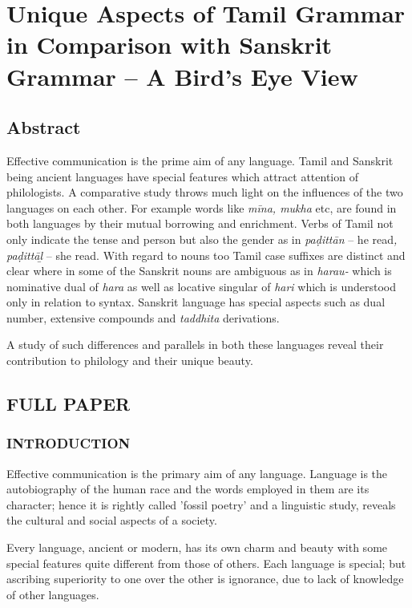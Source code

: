 
\chapter{Unique Aspects of Tamil Grammar in Comparison with Sanskrit Grammar – A Bird’s Eye View}\label{intro}



\section*{Abstract}

Effective communication is the prime aim of any language. Tamil and Sanskrit being ancient languages have special features which attract attention of philologists. A comparative study throws much light on the influences of the two languages on each other. For example words like \textit{mīna, mukha} etc, are found in both languages by their mutual borrowing and enrichment. Verbs of Tamil not only indicate the tense and person but also the gender as in \textit{paḍittān} – he read\textit{, paḍittāḻ} – she read. With regard to nouns too Tamil case suffixes are distinct and clear where in some of the Sanskrit nouns are ambiguous as in \textit{harau-} which is nominative dual of \textit{hara} as well as locative singular of \textit{hari} which is understood only in relation to syntax. Sanskrit language has special aspects such as dual number, extensive compounds and \textit{taddhita} derivations.

A study of such differences and parallels in both these languages reveal their contribution to philology and their unique beauty.


\section*{FULL PAPER}

\subsection*{INTRODUCTION}

Effective communication is the primary aim of any language. Language is the autobiography of the human race and the words employed in them are its character; hence it is rightly called 'fossil poetry’ and a linguistic study, reveals the cultural and social aspects of a society.

Every language, ancient or modern, has its own charm and beauty with some special features quite different from those of others. Each language is special; but ascribing superiority to one over the other is ignorance, due to lack of knowledge of other languages.

